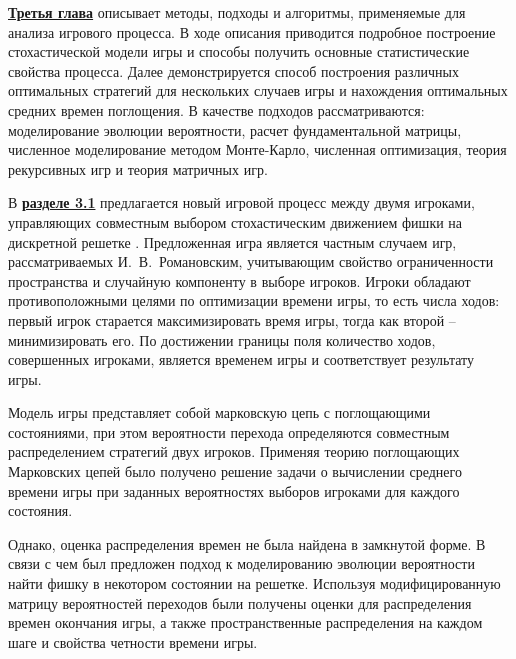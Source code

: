 

\underline{\textbf{Третья глава}} описывает методы, подходы и алгоритмы, применяемые для анализа игрового процесса. В ходе описания приводится подробное построение стохастической модели игры и способы получить основные статистические свойства процесса. Далее демонстрируется способ построения различных оптимальных стратегий для нескольких случаев игры и нахождения оптимальных средних времен поглощения. В качестве подходов рассматриваются: моделирование эволюции вероятности, расчет фундаментальной матрицы, численное моделирование методом Монте-Карло, численная оптимизация, теория рекурсивных игр и теория матричных игр. 

В \underline{\textbf{разделе 3.1}} предлагается новый игровой процесс между двумя игроками, управляющих совместным выбором стохастическим движением фишки на дискретной решетке \cite{bib3}. Предложенная игра является частным случаем игр, рассматриваемых И.~В.~Романовским, учитывающим свойство ограниченности пространства и случайную компоненту в выборе игроков. Игроки обладают противоположными целями по оптимизации времени игры, то есть числа ходов: первый игрок старается максимизировать время игры, тогда как второй -- минимизировать его. По достижении границы поля количество ходов, совершенных игроками, является временем игры и соответствует результату игры.

Модель игры представляет собой марковскую цепь с поглощающими состояниями, при этом вероятности перехода определяются совместным распределением стратегий двух игроков. Применяя теорию поглощающих Марковских цепей было получено решение задачи о вычислении среднего времени игры при заданных вероятностях выборов игроками для каждого состояния. 

Однако, оценка распределения времен не была найдена в замкнутой форме. В связи с чем был предложен подход к моделированию эволюции вероятности найти фишку в некотором состоянии на решетке. Используя модифицированную матрицу вероятностей переходов были получены оценки для распределения времен окончания игры, а также пространственные распределения на каждом шаге и свойства четности времени игры.


